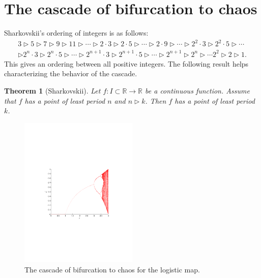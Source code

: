 \documentclass[12pt]{article}
\theoremstyle{plain}
\newtheorem{theorem}{Theorem}[section]
\def\IR{\mathbb{R}}
\begin{document}
\section{The cascade of bifurcation to chaos}
\label{sec:chaos}
Sharkovskii's ordering of integers is as follows:
\begin{gather*}
3\triangleright 5\triangleright 7 \triangleright 9 \triangleright 11\triangleright \cdots \triangleright 2\cdot 3\triangleright  2\cdot 5\triangleright \cdots \triangleright 2\cdot 9\triangleright\cdots\triangleright 2^2\cdot 3\triangleright 2^2\cdot 5\triangleright \cdots \\
\triangleright 2^n\cdot 3\triangleright 2^n\cdot 5\triangleright \cdots\triangleright 2^{n+1}\cdot 3\triangleright 2^{n+1}\cdot 5\triangleright \cdots
\triangleright 2^{n+1}\triangleright 2^n\triangleright \cdots 2^2 \triangleright 2\triangleright 1.
\end{gather*}
This gives an ordering between all positive integers. The following result helps characterizing the behavior of the cascade.
\begin{theorem}[Sharkovskii]\label{th:sharkovskii}
Let $f:I\subset\IR\to\IR$ be a continuous function. Assume that $f$ has a point of least period $n$ and $n\triangleright k$. Then $f$ has a point of least period $k$.
\end{theorem}


\begin{figure}[htbp]
\begin{center}
\includegraphics[width=0.5\textwidth]{analysis_logistic_cascade_full}
\end{center}
\caption{The cascade of bifurcation to chaos for the logistic map.}
\end{figure}
\end{document}
